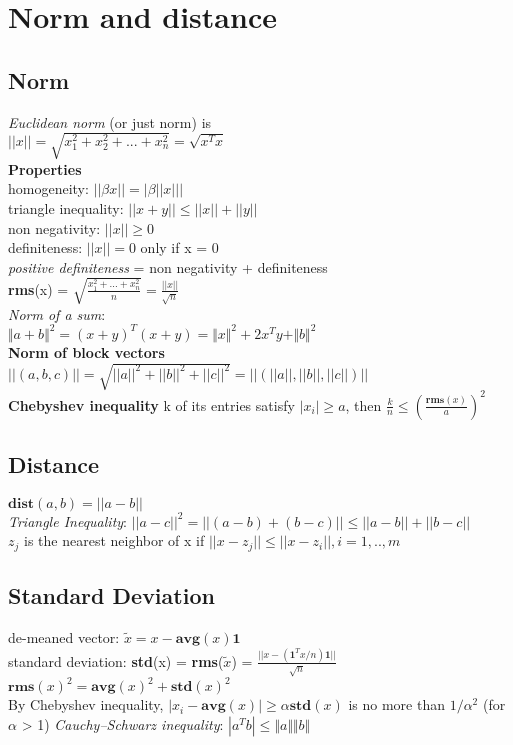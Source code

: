 \section{Norm and distance}
\subsection{Norm} 
\textit{Euclidean norm} (or just norm) is\\
$||x||= \sqrt{x_1^2+x_2^2+...+x_n^2}= \sqrt{x^Tx}$\\
\textbf{Properties}\\
\textbullet homogeneity: $||\beta x|| = |\beta ||x|||$\\
\textbullet triangle inequality: $||x + y|| \leq ||x|| + ||y||$\\
\textbullet non negativity: $||x|| \geq 0$\\
\textbullet definiteness: $||x|| = 0$ only if x = 0\\
\textit{positive definiteness} = non negativity + definiteness\\
\textbf{rms}(x) = $\sqrt{\frac{x_1^2+...+x_n^2}{n}} = \frac{||x||}{\sqrt{n}}$ \\
\textbullet \textit{Norm of a sum}:\\ 
$\Vert a + b \Vert^2 = (x + y)^T(x + y) = \Vert x \Vert^2 + 2x^Ty + \Vert b \Vert^2$\\
\textbf{Norm of block vectors}
$||(a,b,c)|| = \sqrt{||a||^2 + ||b||^2 + ||c||^2} = ||(||a||, ||b||, ||c||)||$\\
\textbf{Chebyshev inequality}
k of its entries satisfy $|x_i| \geq a$, then $\frac{k}{n} \leq (\frac{\textbf{rms}(x)}{a})^2$
\subsection{Distance}
$\textbf{dist}(a,b) = ||a - b||$\\
\textit{Triangle Inequality}: $||a - c||^2 = ||(a - b) + (b - c)|| \leq ||a-b|| + ||b-c||$\\
$z_j$ is the nearest neighbor of x if $||x-z_j|| \leq ||x-z_i||, i=1,..,m$\\

\subsection{Standard Deviation}
de-meaned vector: $\tilde{x} = x - \textbf{avg}(x)\textbf{1}$\\
standard deviation: \textbf{std}(x) = \textbf{rms}($\tilde{x}$) = $\frac{||x - (\textbf{1}^Tx/n)\textbf{1}||}{\sqrt{n}}$\\
${\textbf{rms}(x)}^2 = {\textbf{avg}(x)}^2 + {\textbf{std}(x)}^2$\\
By Chebyshev inequality, $|x_i - \textbf{avg}(x)| \geq \alpha \textbf{std}(x)$ is no more than $1/\alpha^2$ (for 
$\alpha$ > 1)
\textit{Cauchy–Schwarz inequality}: $|a^Tb| \leq \Vert a\Vert \Vert b \Vert$

